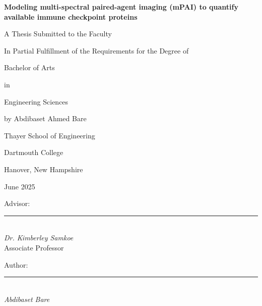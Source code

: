 \begin{titlepage}
    \centering
    \vspace*{1cm}
    
    {\LARGE\bfseries Modeling multi-spectral paired-agent imaging (mPAI)  to quantify available immune checkpoint proteins \par}
    \vspace{1.5cm}
    
    {\large A Thesis Submitted to the Faculty \par}
    \vspace{0.2cm}
    {\large In Partial Fulfillment of the Requirements for the Degree of \par}
    \vspace{0.3cm}
    {\large Bachelor of Arts \par}
    \vspace{0.2cm}
    {\large in \par}
    \vspace{0.2cm}
    {\large Engineering Sciences \par}
    \vspace{1.5cm}
    
    {\large by Abdibaset Ahmed Bare \par}
    \vspace{1.5cm}
    
    {\large Thayer School of Engineering \par}
    {\large Dartmouth College \par}
    {\large Hanover, New Hampshire \par}
    \vspace{0.5cm}
    {\large June 2025 \par}
    
    \vspace*{\fill}


\begin{flushleft}
{\normalsize Advisor: \rule{7cm}{0.4pt} \\
\textit{Dr. Kimberley Samkoe} \\
Associate Professor}
\end{flushleft}

\begin{flushleft}
{\normalsize Author: \rule{7cm}{0.4pt} \\
\textit{Abdibaset Bare}}
\end{flushleft}


\vspace{1cm}
\end{titlepage}
